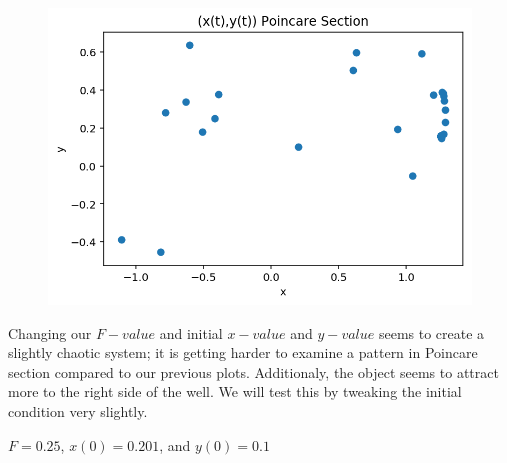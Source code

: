 \documentclass{article}
\begin{document}
\begin{figure}[h!]
\includegraphics[scale=0.4]{poincare3.png}
\end{figure}

Changing our $F-value$ and initial $x-value$ and $y-value$ seems to create a slightly chaotic system; it is getting harder to examine a pattern in Poincare section compared to our previous plots. Additionaly, the object seems to attract more to the right side of the well. We will test this by tweaking the initial condition very slightly.

$F = 0.25$, $x(0) = 0.201$, and $y(0) = 0.1$
\end{document}
